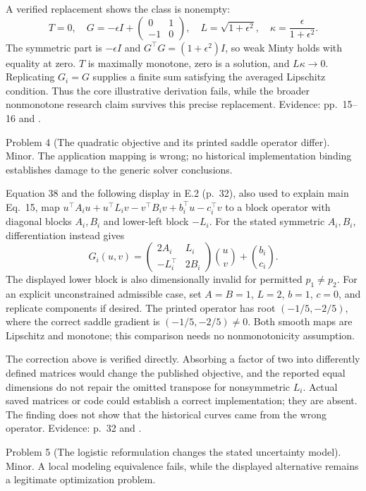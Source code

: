 \documentclass[10pt]{article}
\begin{document}
A verified replacement shows the class is nonempty: \[T=0,\quad G=-\epsilon I+
 \begin{pmatrix}0&1\\-1&0\end{pmatrix},\quad
 L=\sqrt{1+\epsilon^2},\quad
 \kappa=\frac{\epsilon}{1+\epsilon^2}.\] The symmetric part is \(-\epsilon I\) and \(G^\top G=(1+\epsilon^2)I\), so weak Minty holds with equality at zero. \(T\) is maximally monotone, zero is a solution, and \(L\kappa\to0\). Replicating \(G_i=G\) supplies a finite sum satisfying the averaged Lipschitz condition. Thus the core illustrative derivation fails, while the broader nonmonotone research claim survives this precise replacement. Evidence: pp. 15–16 and .\par
Problem 4 (The quadratic objective and its printed saddle operator differ).  Minor. The application mapping is wrong; no historical implementation binding establishes damage to the generic solver conclusions.\par
Equation 38 and the following display in E.2 (p. 32), also used to explain main Eq. 15, map \(u^\top A_i u+u^\top L_i v-v^\top B_i v+b_i^\top u-c_i^\top v\) to a block operator with diagonal blocks \(A_i,B_i\) and lower-left block \(-L_i\). For the stated symmetric \(A_i,B_i\), differentiation instead gives \[G_i(u,v)=
 \begin{pmatrix}2A_i&L_i\\-L_i^\top&2B_i\end{pmatrix}
 \binom uv+\binom{b_i}{c_i}.\] The displayed lower block is also dimensionally invalid for permitted \(p_1\ne p_2\). For an explicit unconstrained admissible case, set \(A=B=1\), \(L=2\), \(b=1\), \(c=0\), and replicate components if desired. The printed operator has root \((-1/5,-2/5)\), where the correct saddle gradient is \((-1/5,-2/5)\ne0\). Both smooth maps are Lipschitz and monotone; this comparison needs no nonmonotonicity assumption.\par
The correction above is verified directly. Absorbing a factor of two into differently defined matrices would change the published objective, and the reported equal dimensions do not repair the omitted transpose for nonsymmetric \(L_i\). Actual saved matrices or code could establish a correct implementation; they are absent. The finding does not show that the historical curves came from the wrong operator. Evidence: p. 32 and .\par
Problem 5 (The logistic reformulation changes the stated uncertainty model).  Minor. A local modeling equivalence fails, while the displayed alternative remains a legitimate optimization problem.\par
\end{document}
